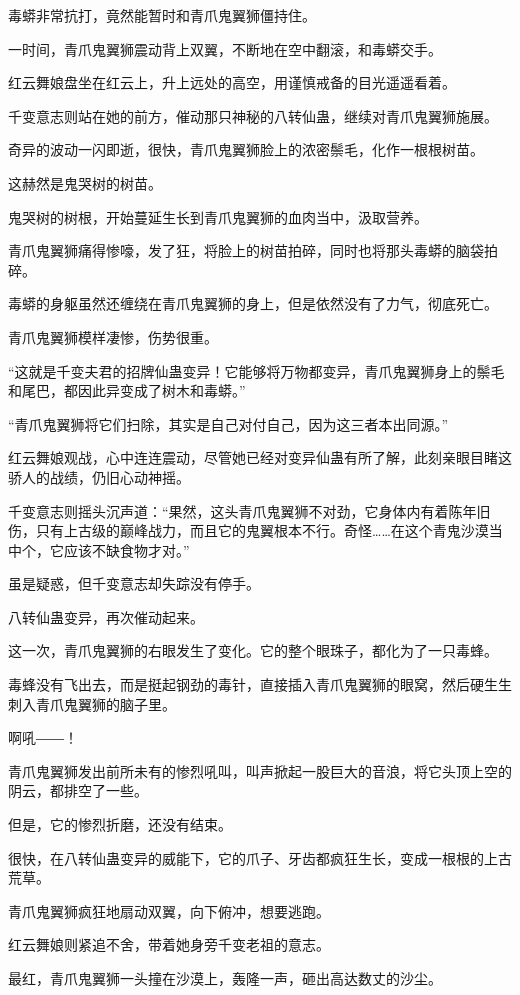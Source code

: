 \begin{this_body}
毒蟒非常抗打，竟然能暂时和青爪鬼翼狮僵持住。

一时间，青爪鬼翼狮震动背上双翼，不断地在空中翻滚，和毒蟒交手。

红云舞娘盘坐在红云上，升上远处的高空，用谨慎戒备的目光遥遥看着。

千变意志则站在她的前方，催动那只神秘的八转仙蛊，继续对青爪鬼翼狮施展。

奇异的波动一闪即逝，很快，青爪鬼翼狮脸上的浓密鬃毛，化作一根根树苗。

这赫然是鬼哭树的树苗。

鬼哭树的树根，开始蔓延生长到青爪鬼翼狮的血肉当中，汲取营养。

青爪鬼翼狮痛得惨嚎，发了狂，将脸上的树苗拍碎，同时也将那头毒蟒的脑袋拍碎。

毒蟒的身躯虽然还缠绕在青爪鬼翼狮的身上，但是依然没有了力气，彻底死亡。

青爪鬼翼狮模样凄惨，伤势很重。

“这就是千变夫君的招牌仙蛊变异！它能够将万物都变异，青爪鬼翼狮身上的鬃毛和尾巴，都因此异变成了树木和毒蟒。”

“青爪鬼翼狮将它们扫除，其实是自己对付自己，因为这三者本出同源。”

红云舞娘观战，心中连连震动，尽管她已经对变异仙蛊有所了解，此刻亲眼目睹这骄人的战绩，仍旧心动神摇。

千变意志则摇头沉声道：“果然，这头青爪鬼翼狮不对劲，它身体内有着陈年旧伤，只有上古级的巅峰战力，而且它的鬼翼根本不行。奇怪……在这个青鬼沙漠当中个，它应该不缺食物才对。”

虽是疑惑，但千变意志却失踪没有停手。

八转仙蛊变异，再次催动起来。

这一次，青爪鬼翼狮的右眼发生了变化。它的整个眼珠子，都化为了一只毒蜂。

毒蜂没有飞出去，而是挺起钢劲的毒针，直接插入青爪鬼翼狮的眼窝，然后硬生生刺入青爪鬼翼狮的脑子里。

啊吼――！

青爪鬼翼狮发出前所未有的惨烈吼叫，叫声掀起一股巨大的音浪，将它头顶上空的阴云，都排空了一些。

但是，它的惨烈折磨，还没有结束。

很快，在八转仙蛊变异的威能下，它的爪子、牙齿都疯狂生长，变成一根根的上古荒草。

青爪鬼翼狮疯狂地扇动双翼，向下俯冲，想要逃跑。

红云舞娘则紧追不舍，带着她身旁千变老祖的意志。

最红，青爪鬼翼狮一头撞在沙漠上，轰隆一声，砸出高达数丈的沙尘。


\end{this_body}
